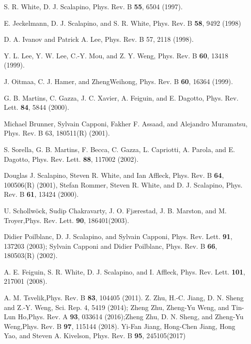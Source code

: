 \documentclass[aps,prb,twocolumn,notitlepage,superscriptaddress,showpacs]{revtex4-1}
\begin{document}
\begin{thebibliography}{99}
  S. R. White, D. J. Scalapino, Phys. Rev. B \textbf{55}, 6504 (1997).

  E. Jeckelmann, D. J. Scalapino, and S. R. White, Phys. Rev. B \textbf{58}, 9492 (1998)

   D. A. Ivanov and Patrick A. Lee, Phys. Rev. B 57, 2118 (1998).

   Y. L. Lee, Y. W. Lee, C.-Y. Mou, and Z. Y. Weng, Phys. Rev. B \textbf{60}, 13418 (1999).

  J. Oitmaa, C. J. Hamer, and  ZhengWeihong, Phys. Rev. B \textbf{60}, 16364 (1999).

  G. B. Martins, C. Gazza, J. C. Xavier, A. Feiguin, and E. Dagotto, Phys. Rev. Lett. \textbf{84}, 5844 (2000).

    Michael Brunner, Sylvain Capponi, Fakher F. Assaad, and Alejandro Muramatsu, Phys. Rev. B 63, 180511(R) (2001).

  S. Sorella, G. B. Martins, F. Becca, C. Gazza, L. Capriotti, A. Parola, and E. Dagotto, Phys. Rev. Lett. \textbf{88}, 117002 (2002).

   Douglas J. Scalapino, Steven R. White, and Ian Affleck, Phys. Rev. B \textbf{64}, 100506(R) (2001), Stefan Rommer, Steven R. White, and D. J. Scalapino, Phys. Rev. B \textbf{61}, 13424 (2000).

   U. Schollw\"{o}ck, Sudip Chakravarty, J. O. Fj{\ae}restad, J. B. Marston, and M. Troyer,Phys. Rev. Lett. \textbf{90}, 186401(2003).

    Didier Poilblanc, D. J. Scalapino, and Sylvain Capponi, Phys. Rev. Lett. \textbf{91}, 137203 (2003);  Sylvain Capponi and Didier Poilblanc, Phys. Rev. B \textbf{66}, 180503(R) (2002).

     A. E. Feiguin, S. R. White, D. J. Scalapino, and I. Affleck, Phys. Rev. Lett. \textbf{101}, 217001 (2008).

     A. M. Tsvelik,Phys. Rev. B \textbf{83}, 104405 (2011).
Z. Zhu, H.-C. Jiang, D. N. Sheng and Z.-Y. Weng, Sci. Rep. 4, 5419 (2014); Zheng Zhu, Zheng-Yu Weng, and Tin-Lun Ho,Phys. Rev. A \textbf{93}, 033614 (2016);Zheng Zhu, D. N. Sheng, and Zheng-Yu Weng,Phys. Rev. B \textbf{97}, 115144 (2018).
     Yi-Fan Jiang, Hong-Chen Jiang, Hong Yao, and Steven A. Kivelson, Phys. Rev. B \textbf{95}, 245105(2017)


\end{thebibliography}
\end{document}
